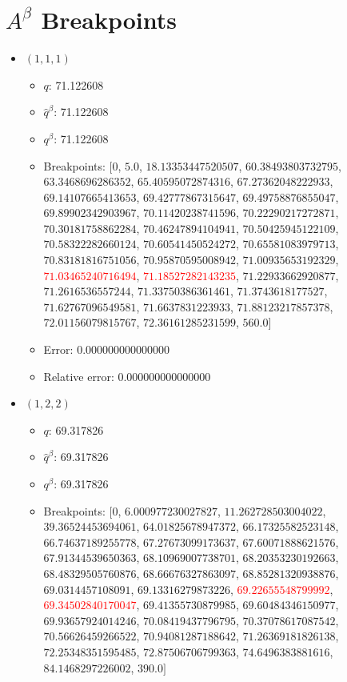 \documentclass{article}%
\begin{document}
\section{$A^\beta$ Breakpoints}%
\thispagestyle{plain}%
\begin{itemize}%
	\item $(1, 1, 1)$%
	\begin{itemize}%
		\item $q$: 71.122608%
		\item $\hat{q}^\beta$: 71.122608%
		\item $q^\beta$: 71.122608%
		\item Breakpoints: $[$$0$, $5.0$, $18.13353447520507$, $60.38493803732795$, $63.3468696286352$, $65.40595072874316$, $67.27362048222933$, $69.14107665413653$, $69.42777867315647$, $69.49758876855047$, $69.89902342903967$, $70.11420238741596$, $70.22290217272871$, $70.30181758862284$, $70.46247894104941$, $70.50425945122109$, $70.58322282660124$, $70.60541450524272$, $70.65581083979713$, $70.83181816751056$, $70.95870595008942$, $71.00935653192329$, \textcolor{red}{$71.03465240716494$}, \textcolor{red}{$71.18527282143235$}, $71.22933662920877$, $71.2616536557244$, $71.33750386361461$, $71.3743618177527$, $71.62767096549581$, $71.6637831223933$, $71.88123217857378$, $72.01156079815767$, $72.36161285231599$, $560.0$$]$%
		\item Error: 0.000000000000000%
		\item Relative error: 0.000000000000000%
	\end{itemize}%
	\item $(1, 2, 2)$%
	\begin{itemize}%
		\item $q$: 69.317826%
		\item $\hat{q}^\beta$: 69.317826%
		\item $q^\beta$: 69.317826%
		\item Breakpoints: $[$$0$, $6.000977230027827$, $11.262728503004022$, $39.36524453694061$, $64.01825678947372$, $66.17325582523148$, $66.74637189255778$, $67.27673099173637$, $67.60071888621576$, $67.91344539650363$, $68.10969007738701$, $68.20353230192663$, $68.48329505760876$, $68.66676327863097$, $68.85281320938876$, $69.0314457108091$, $69.13316279873226$, \textcolor{red}{$69.22655548799992$}, \textcolor{red}{$69.34502840170047$}, $69.41355730879985$, $69.60484346150977$, $69.93657924014246$, $70.08419437796795$, $70.37078617087542$, $70.56626459266522$, $70.94081287188642$, $71.26369181826138$, $72.25348351595485$, $72.87506706799363$, $74.6496383881616$, $84.1468297226002$, $390.0$$]$%

\end{itemize}
\end{itemize}
\end{document}
